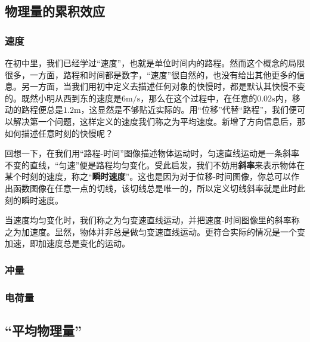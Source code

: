 
\subsection{物理量的累积效应}
\subsubsection{速度}
在初中里，我们已经学过“速度”，也就是单位时间内的路程。然而这个概念的局限很多，一方面，路程和时间都是数字，“速度”很自然的，也没有给出其他更多的信息。另一方面，当我们用初中定义去描述任何对象的快慢时，都是默认其快慢不变的。既然小明从西到东的速度是$6 \mathrm{m/s}$，那么在这个过程中，在任意的$0.02\mathrm s$内，移动的路程便总是$1.2\mathrm m$，这显然是不够贴近实际的。用“位移”代替“路程”，我们便可以解决第一个问题，这样定义的速度我们称之为平均速度。新增了方向信息后，那如何描述任意时刻的快慢呢？

回想一下，在我们用“路程-时间”图像描述物体运动时，匀速直线运动是一条斜率不变的直线，“匀速”便是路程均匀变化。受此启发，我们不妨用\textbf{斜率}来表示物体在某个时刻的速度，称之“\textbf{瞬时速度}”。这也是因为对于位移-时间图像，你总可以作出函数图像在任意一点的切线，该切线总是唯一的，所以定义切线斜率就是此时此刻的瞬时速度。

当速度均匀变化时，我们称之为匀变速直线运动，并把速度-时间图像里的斜率称之为加速度。显然，物体并非总是做匀变速直线运动。更符合实际的情况是一个变加速，即加速度总是变化的运动。

\subsubsection{冲量}
\subsubsection{电荷量}
\subsection{“平均物理量”}
